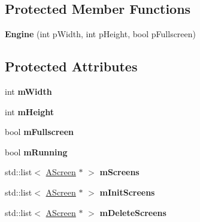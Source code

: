 \subsection*{\-Protected \-Member \-Functions}
\begin{DoxyCompactItemize}
\item 
\hypertarget{classde_1_1_engine_a9263c32f13aa37f5cc5d747b21b3c891}{
{\bfseries \-Engine} (int p\-Width, int p\-Height, bool p\-Fullscreen)}
\label{classde_1_1_engine_a9263c32f13aa37f5cc5d747b21b3c891}

\end{DoxyCompactItemize}
\subsection*{\-Protected \-Attributes}
\begin{DoxyCompactItemize}
\item 
\hypertarget{classde_1_1_engine_abaf67500a242fdcbe850d0c45ee30636}{
int {\bfseries m\-Width}}
\label{classde_1_1_engine_abaf67500a242fdcbe850d0c45ee30636}

\item 
\hypertarget{classde_1_1_engine_a9fe6e8f5b32ed72b76e1194bab99feb1}{
int {\bfseries m\-Height}}
\label{classde_1_1_engine_a9fe6e8f5b32ed72b76e1194bab99feb1}

\item 
\hypertarget{classde_1_1_engine_a335a0392ce9cfc6ce5625ea991d4849d}{
bool {\bfseries m\-Fullscreen}}
\label{classde_1_1_engine_a335a0392ce9cfc6ce5625ea991d4849d}

\item 
\hypertarget{classde_1_1_engine_ac9af7310cc233aa5dd2149e7f6dfe6c6}{
bool {\bfseries m\-Running}}
\label{classde_1_1_engine_ac9af7310cc233aa5dd2149e7f6dfe6c6}

\item 
\hypertarget{classde_1_1_engine_af81f599248b3a98783e4250b57f180b9}{
std\-::list$<$ \hyperlink{classde_1_1_a_screen}{\-A\-Screen} $\ast$ $>$ {\bfseries m\-Screens}}
\label{classde_1_1_engine_af81f599248b3a98783e4250b57f180b9}

\item 
\hypertarget{classde_1_1_engine_a328645ef9103750ac2bc24b4ddd7963c}{
std\-::list$<$ \hyperlink{classde_1_1_a_screen}{\-A\-Screen} $\ast$ $>$ {\bfseries m\-Init\-Screens}}
\label{classde_1_1_engine_a328645ef9103750ac2bc24b4ddd7963c}

\item 
\hypertarget{classde_1_1_engine_a9629a734c18b2d077c42df1398090735}{
std\-::list$<$ \hyperlink{classde_1_1_a_screen}{\-A\-Screen} $\ast$ $>$ {\bfseries m\-Delete\-Screens}}
\label{classde_1_1_engine_a9629a734c18b2d077c42df1398090735}

\end{DoxyCompactItemize}
